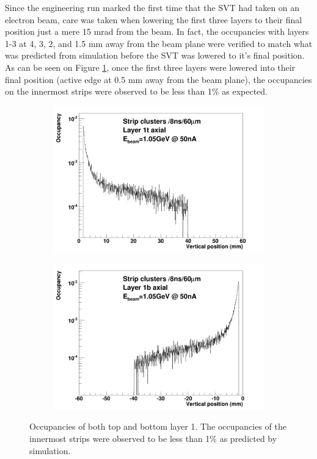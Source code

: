 Since the engineering run marked the first time that the SVT had taken on an 
electron beam, care was taken when lowering the first three layers to their 
final position just a mere 15 mrad from the beam.  In fact, the occupancies 
with layers 1-3 at 4, 3, 2, and 1.5 mm away from the beam plane were verified to
match what was predicted from simulation before the SVT was lowered to it's final
position.  As can be seen on Figure \ref{fig:occupancies}, once the first
three layers were lowered into their final position (active edge at 0.5 mm away from the
beam plane), the occupancies on the innermost strips were observed to be less
than 1\% as expected.
\begin{figure}[h!b]
    \begin{subfigure}{.5\textwidth}
        \centering
        \includegraphics[width=\textwidth]{images/cluster_occupancy_L1t_axial.png}
    \end{subfigure}
    \begin{subfigure}{.5\textwidth}
        \centering
        \includegraphics[width=\textwidth]{images/cluster_occupancy_L1b_axial.png}
    \end{subfigure}
    \caption{Occupancies of both top and bottom layer 1.  The occupancies of 
             the innermost strips were observed to be less than 1\% as predicted
             by simulation.}
    \label{fig:occupancies}
\end{figure}  

